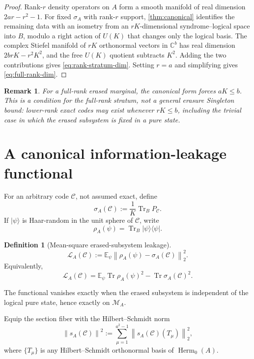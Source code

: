 \documentclass[11pt]{article}
\newtheorem{remark}[theorem]{Remark}
\theoremstyle{definition}
\newtheorem{definition}[theorem]{Definition}
\newcommand{\cC}{\mathcal C}
\newcommand{\cM}{\mathcal M}
\newcommand{\cL}{\mathcal L}
\newcommand{\Herm}{\operatorname{Herm}}
\newcommand{\Tr}{\operatorname{Tr}}
\newcommand{\C}{\mathbb C}
\newcommand{\1}{\mathbf 1}
\newcommand{\ket}[1]{\lvert #1\rangle}
\newcommand{\bra}[1]{\langle #1\rvert}
\newcommand{\norm}[1]{\left\lVert #1\right\rVert}
\begin{document}
\begin{proof}
Rank-$r$ density operators on $A$ form a smooth manifold of real dimension $2ar-r^2-1$.  For fixed $\sigma_A$ with rank-$r$ support, \cref{thm:canonical} identifies the remaining data with an isometry from an $rK$-dimensional syndrome--logical space into $B$, modulo a right action of $U(K)$ that changes only the logical basis.  The complex Stiefel manifold of $rK$ orthonormal vectors in $\C^b$ has real dimension $2brK-r^2K^2$, and the free $U(K)$ quotient subtracts $K^2$.  Adding the two contributions gives \eqref{eq:rank-stratum-dim}.  Setting $r=a$ and simplifying gives \eqref{eq:full-rank-dim}.
\end{proof}

\begin{remark}
For a full-rank erased marginal, the canonical form forces $aK\le b$.  This is a condition for the full-rank stratum, not a general erasure Singleton bound: lower-rank exact codes may exist whenever $rK\le b$, including the trivial case in which the erased subsystem is fixed in a pure state.
\end{remark}

\section{A canonical information-leakage functional}

For an arbitrary code $\cC$, not assumed exact, define
\[
\sigma_A(\cC):=\frac1K\Tr_B P_{\cC}.
\]
If $\ket{\psi}$ is Haar-random in the unit sphere of $\cC$, write
\[
\rho_A(\psi)=\Tr_B\ket{\psi}\bra{\psi}.
\]

\begin{definition}[Mean-square erased-subsystem leakage]
\begin{equation}
\cL_A(\cC)
:=
\mathbb E_{\psi}
\norm{\rho_A(\psi)-\sigma_A(\cC)}_2^2.
\label{eq:leakage-def}
\end{equation}
Equivalently,
\begin{equation}
\cL_A(\cC)
=
\mathbb E_{\psi}\Tr\rho_A(\psi)^2
-\Tr\sigma_A(\cC)^2.
\label{eq:purity-variance}
\end{equation}
\end{definition}

The functional vanishes exactly when the erased subsystem is independent of the logical pure state, hence exactly on $\cM_A$.

Equip the section fiber with the Hilbert--Schmidt norm
\begin{equation}
\norm{s_A(\cC)}^2
:=\sum_{\mu=1}^{a^2-1}
\norm{s_A(\cC)(T_\mu)}_2^2,
\label{eq:section-norm}
\end{equation}
where $\{T_\mu\}$ is any Hilbert--Schmidt orthonormal basis of $\Herm_0(A)$.
\end{document}
